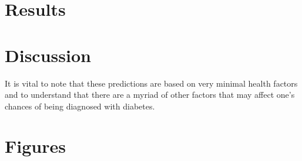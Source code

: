 \documentclass [letterpaper]{article}
\begin{document}
\section{Results}

\section{Discussion}
It is vital to note that these predictions are based on very minimal health factors and to understand that there are a myriad of other factors that may affect one's chances of being diagnosed with diabetes.

\section{Figures}
\end{document}
